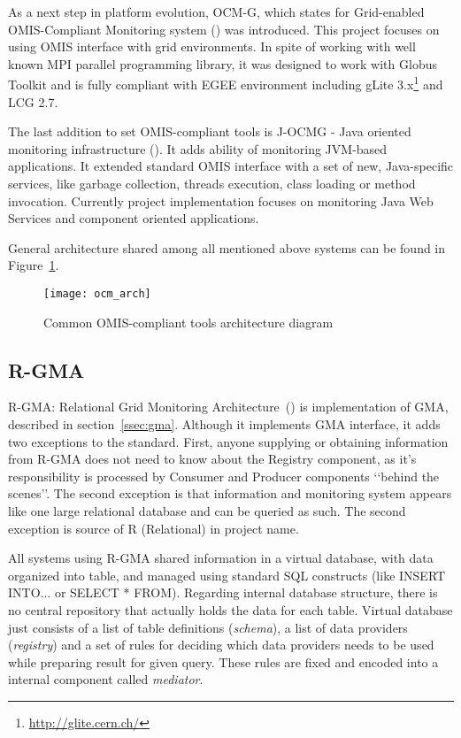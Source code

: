 As a next step in platform evolution, OCM-G, which states for Grid-enabled OMIS-Compliant Monitoring system (\cite{axgrid03b}) was introduced. This project focuses on using OMIS interface with grid environments.  In spite of working with well known MPI parallel programming library, it was designed to work with Globus Toolkit and is fully compliant with EGEE environment including gLite 3.x\footnote{\url{http://glite.cern.ch/}} and LCG 2.7. 

The last addition to set OMIS-compliant tools is J-OCMG - Java oriented monitoring infrastructure (\cite{jocm}). It adds ability of monitoring JVM-based applications. It extended standard OMIS interface with a set of new, Java-specific services, like garbage collection, threads execution, class loading or method invocation. Currently project implementation focuses on monitoring Java Web Services and component oriented applications.

General architecture shared among all mentioned above systems can be found in Figure~\ref{fig:ocmg}.

\begin{figure}[ht]
  \centering
  \texttt{[image: ocm\_arch]}
  \caption{Common OMIS-compliant tools architecture diagram}
  \label{fig:ocmg}
\end{figure}
 
 
 
\subsection{R-GMA}

R-GMA: Relational Grid Monitoring Architecture~(\cite{RGMA1,RGMA2,RGMA3}) is implementation of GMA, described in section~\ref{ssec:gma}. Although it implements GMA interface, it adds two exceptions to the standard. First, anyone supplying or obtaining information from R-GMA does not need to know about the Registry component, as it\rq{}s responsibility is processed by Consumer and Producer components \lq\lq{}behind the scenes\rq\rq{}. The second exception is that information and monitoring system appears like one large relational database and can be queried as such. The second exception is source of R (Relational) in project name.

All systems using R-GMA shared information in a virtual database, with data organized into table, and managed using standard SQL constructs (like INSERT INTO... or SELECT * FROM). Regarding internal database structure, there is no central repository that actually holds the data for each table. Virtual database just consists of a list of table definitions (\emph{schema}), a list of data providers (\emph{registry}) and a set of rules for deciding which data providers needs to be used while preparing result for given query. These rules are fixed and encoded into a internal component called \emph{mediator}.

